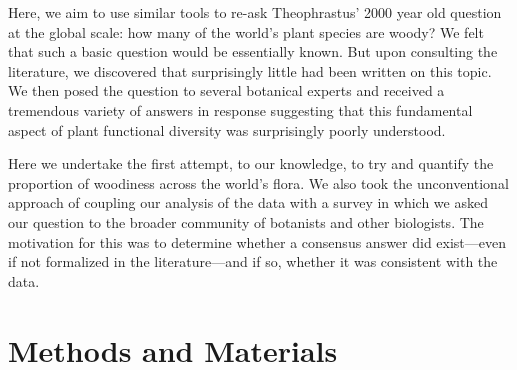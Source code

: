 \documentclass[12pt]{article}
\begin{document}
% 
Here, we aim to use similar tools to re-ask Theophrastus' 2000 year
old question at the global scale: how many of the world's plant
species are woody?
% 
We felt that such a basic question would be essentially known.  But
upon consulting the literature, we discovered that surprisingly little
had been written on this topic. We then posed the question to several
botanical experts and received a tremendous variety of answers in
response suggesting that this fundamental aspect of plant functional
diversity was surprisingly poorly understood. 

Here we undertake the first attempt, to our knowledge, to try and
quantify the proportion of woodiness across the world's flora. We also
took the unconventional approach of coupling our analysis of the data
with a survey in which we asked our question to the broader community
of botanists and other biologists. The motivation for this was to
determine whether a consensus answer did exist---even if not
formalized in the literature---and if so, whether it was consistent
with the data.



\section{Methods and Materials}
\end{document}
